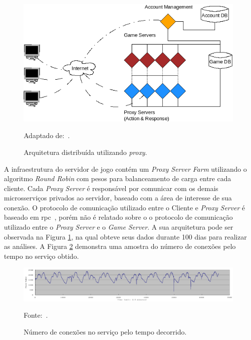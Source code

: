 \begin{figure}[htb!]
\caption{Arquitetura distribuída utilizando \textit{proxy}.}
\vspace{-0.3cm}
\label{fig:game_with_proxy}
\includegraphics[width=.7\textwidth]{img/cap2/game_with_proxy.png}
\centering

Adaptado de:~\cite{1417630}.
\end{figure}



A infraestrutura do servidor de jogo contém um \textit{Proxy Server Farm} utilizando o algoritmo \textit{Round Robin} com pesos para balanceamento de carga entre cada cliente.
%
Cada \textit{Proxy Server} é responsável por comunicar com os demais microsserviços privados ao servidor, baseado com a área de interesse de sua conexão.
%
O protocolo de comunicação utilizado entre o Cliente e \textit{Proxy Server} é baseado em \ac{rpc}~\cite{faber, borella}, porém não é relatado sobre o o protocolo de comunicação utilizado entre o \textit{Proxy Server} e o \textit{Game Server}.
%
A sua arquitetura pode ser observada na Figura \ref{fig:game_with_proxy}, na qual obteve seus dados durante 100 dias para realizar as análises.
%
A Figura \ref{fig:players_peer_time} demonstra uma amostra do número de conexões pelo tempo no serviço obtido.


\vspace{-0.2cm}
\begin{figure}[htb!]
\caption{Número de conexões no serviço pelo tempo decorrido.}
\vspace{-0.4cm}
\label{fig:players_peer_time}
\includegraphics[width=\textwidth]{img/cap2/players_peer_time.png}
\centering

Fonte:~\cite{1417630}.
\end{figure}


